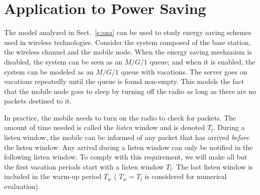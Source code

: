 \documentclass[journal]{IEEEtran}
\begin{document}
\section {Application to Power Saving}
\label{s:illust}
The model analyzed in Sect.~\ref{s:ana} can be used to study energy saving schemes used in wireless technologies. Consider the system composed of the base station, the wireless channel and the mobile node. When the energy saving mechanism is disabled, the system can be seen as an $M/G/1$ queue; and when it is enabled, the system can be modeled as an $M/G/1$ queue with vacations. The server goes on vacations repeatedly until the queue is found non-empty. This models the fact that the mobile node goes to sleep by turning off the radio as long as there are no packets destined to it.

In practice, the mobile needs to turn on the radio to check for packets. The amount of time needed is called the {\em listen} window and is denoted $T_l$. During a listen window, the mobile can be informed of any packet that has arrived {\em before} the listen window. Any arrival during a listen window can only be notified in the following listen window. To comply with this requirement, we will make all but the first vacation periods start with a listen window $T_l$. The last listen window is included in the warm-up period $T_w$ ( $T_w=T_l$ is considered for numerical evaluation).
\end{document}
